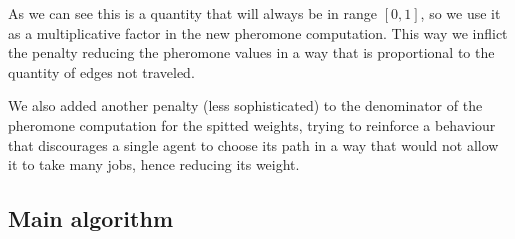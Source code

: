 \documentclass[titlepage]{article}
\begin{document}
As we can see this is a quantity that will always be in range $[0,1]$, so we use it as a multiplicative factor in the new pheromone computation. This way we inflict the penalty reducing the pheromone values in a way that is proportional to the quantity of edges not traveled.

We also added another penalty (less sophisticated) to the denominator of the pheromone computation for the spitted weights, trying to reinforce a behaviour that discourages a single agent to choose its path in a way that would not allow it to take many jobs, hence reducing its weight.

\subsection{Main algorithm}
\end{document}
